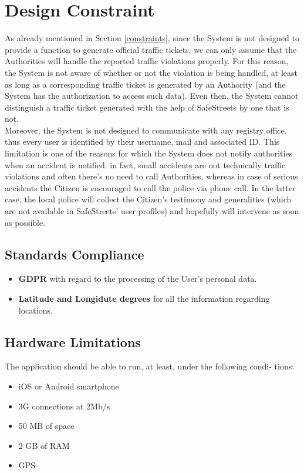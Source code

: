 \documentclass{report}
\begin{document}
\section{Design Constraint}
As already mentioned in Section \ref{constraints}, since the System is not designed to provide a function to generate official traffic tickets, we can only assume that the Authorities will handle the reported traffic violations properly. For this reason, the System is not aware of whether or not the violation is being handled, at least as long as a corresponding traffic ticket is generated by an Authority (and the System has the authorization to access such data). Even then, the System cannot distinguish a traffic ticket generated with the help of SafeStreets by one that is not.
\\
Moreover, the System is not designed to communicate with any registry office, thus every user is identified by their username, mail and associated ID. This limitation is one of the reasons for which the System does not notify authorities when an accident is notified: in fact, small accidents are not technically traffic violations and often there's no need to call Authorities, whereas in case of serious accidents the Citizen is encouraged to call the police via phone call. In the latter case, the local police will collect the Citizen's testimony and generalities (which are not available in SafeStreets' user profiles) and hopefully will intervene as soon as possible. 
\subsection{Standards Compliance}
\begin{itemize}
	\item \textbf{GDPR} with regard to the processing of the User's personal data.
	\item \textbf{Latitude and Longidute degrees} for all the information regarding locations.
\end{itemize}
\subsection{Hardware Limitations}
The application should be able to run, at least, under the following condi-
tions:
\begin{itemize}
	\item iOS or Android smartphone
	\item 3G connections at 2Mb/s
	\item 50 MB of space
	\item 2 GB of RAM
	\item GPS
\end{itemize}
\end{document}
